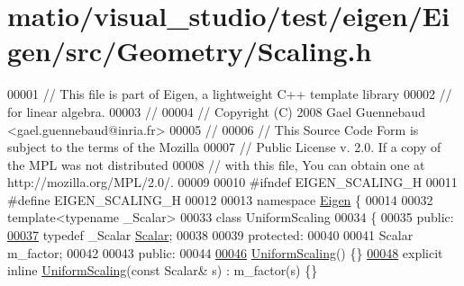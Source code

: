 \hypertarget{matio_2visual__studio_2test_2eigen_2_eigen_2src_2_geometry_2_scaling_8h_source}{}\section{matio/visual\+\_\+studio/test/eigen/\+Eigen/src/\+Geometry/\+Scaling.h}
\label{matio_2visual__studio_2test_2eigen_2_eigen_2src_2_geometry_2_scaling_8h_source}

\begin{DoxyCode}
00001 \textcolor{comment}{// This file is part of Eigen, a lightweight C++ template library}
00002 \textcolor{comment}{// for linear algebra.}
00003 \textcolor{comment}{//}
00004 \textcolor{comment}{// Copyright (C) 2008 Gael Guennebaud <gael.guennebaud@inria.fr>}
00005 \textcolor{comment}{//}
00006 \textcolor{comment}{// This Source Code Form is subject to the terms of the Mozilla}
00007 \textcolor{comment}{// Public License v. 2.0. If a copy of the MPL was not distributed}
00008 \textcolor{comment}{// with this file, You can obtain one at http://mozilla.org/MPL/2.0/.}
00009 
00010 \textcolor{preprocessor}{#ifndef EIGEN\_SCALING\_H}
00011 \textcolor{preprocessor}{#define EIGEN\_SCALING\_H}
00012 
00013 \textcolor{keyword}{namespace }\hyperlink{namespace_eigen}{Eigen} \{ 
00014 
00032 \textcolor{keyword}{template}<\textcolor{keyword}{typename} \_Scalar>
00033 \textcolor{keyword}{class }UniformScaling
00034 \{
00035 \textcolor{keyword}{public}:
\hyperlink{class_eigen_1_1_uniform_scaling_a04c4339f58f1210c5d4d34b1bd7ae283}{00037}   \textcolor{keyword}{typedef} \_Scalar \hyperlink{class_eigen_1_1_uniform_scaling_a04c4339f58f1210c5d4d34b1bd7ae283}{Scalar};
00038 
00039 \textcolor{keyword}{protected}:
00040 
00041   Scalar m\_factor;
00042 
00043 \textcolor{keyword}{public}:
00044 
\hyperlink{class_eigen_1_1_uniform_scaling_ab17e233af501c69ff47c0dd16f43cc39}{00046}   \hyperlink{class_eigen_1_1_uniform_scaling_ab17e233af501c69ff47c0dd16f43cc39}{UniformScaling}() \{\}
\hyperlink{class_eigen_1_1_uniform_scaling_a3a3e2fa318eb29c2c4f87e23a8a75144}{00048}   \textcolor{keyword}{explicit} \textcolor{keyword}{inline} \hyperlink{class_eigen_1_1_uniform_scaling_a3a3e2fa318eb29c2c4f87e23a8a75144}{UniformScaling}(\textcolor{keyword}{const} Scalar& s) : m\_factor(s) \{\}

\end{DoxyCode}
